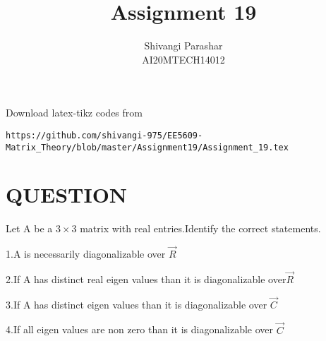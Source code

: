 \documentclass[journal,12pt,twocolumn]{IEEEtran}
\begin{document}
     \def\rightbox#1{\makebox[0in][r]{#1}}
     \def\centbox#1{\makebox[0in]{#1}}
     \def\topbox#1{\raisebox{-\baselineskip}[0in][0in]{#1}}
     \def\midbox#1{\raisebox{-0.5\baselineskip}[0in][0in]{#1}}
\vspace{3cm}
\title{Assignment 19}
\author{Shivangi Parashar\\AI20MTECH14012}
\maketitle
\newpage
\bigskip
\renewcommand{\thefigure}{\theenumi}
\renewcommand{\thetable}{\theenumi}
Download latex-tikz codes from 
%
\begin{lstlisting}
https://github.com/shivangi-975/EE5609-Matrix_Theory/blob/master/Assignment19/Assignment_19.tex
\end{lstlisting}
%
 
\section{QUESTION}
Let A be a $3\times 3$  matrix  with real entries.Identify  the correct statements.

1.A  is necessarily diagonalizable over $\vec{R}$

2.If A has distinct real  eigen values than  it is diagonalizable over$\vec{R}$

3.If A has distinct eigen values than  it is diagonalizable over $\vec{C}$

4.If all eigen values are non zero than it is diagonalizable over $\vec{C}$
%
\end{document}
